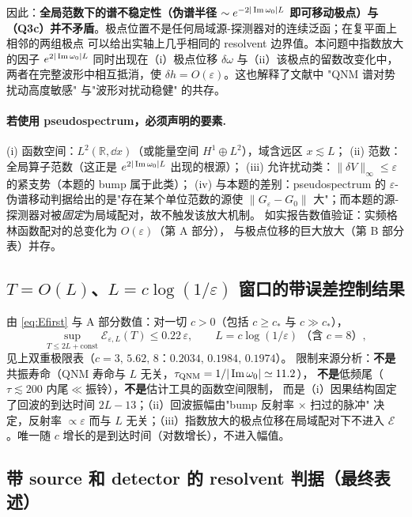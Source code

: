 因此：\textbf{全局范数下的谱不稳定性（伪谱半径 $\sim e^{-2|\operatorname{Im}\omega_0|L}$ 即可移动极点）与
（Q3c）并不矛盾}。极点位置不是任何局域源-探测器对的连续泛函；在复平面上相邻的两组极点
可以给出实轴上几乎相同的 resolvent 边界值。本问题中指数放大的因子
$e^{2|\operatorname{Im}\omega_0|L}$ 同时出现在（i）极点位移 $\delta\omega$ 与（ii）该极点的留数改变化中，
两者在完整波形中相互抵消，使 $\delta h=O(\varepsilon)$。这也解释了文献中
"QNM 谱对势扰动高度敏感" \cite{Jaramillo2021} 与"波形对扰动稳健" \cite{NollertPrice1999} 的共存。

\paragraph{若使用 pseudospectrum，必须声明的要素.}
(i) 函数空间：$L^2(\mathbb R,\dd x)$（或能量空间 $H^1\oplus L^2$），域含远区 $x\lesssim L$；
(ii) 范数：全局算子范数（这正是 $e^{2|\operatorname{Im}\omega_0|L}$ 出现的根源）；
(iii) 允许扰动类：$\|\delta V\|_\infty\le\varepsilon$ 的紧支势（本题的 bump 属于此类）；
(iv) 与本题的差别：pseudospectrum 的 $\varepsilon$-伪谱移动判据给出的是"存在某个单位范数的源使
$\|G_\varepsilon-G_0\|$ 大"；而本题的源-探测器对被\emph{固定}为局域配对，故不触发该放大机制。
如实报告数值验证：实频格林函数配对的总变化为 $O(\varepsilon)$（第 A 部分），
与极点位移的巨大放大（第 B 部分表）并存。

\subsection{$T=O(L)$、$L=c\log(1/\varepsilon)$ 窗口的带误差控制结果}

由 \eqref{eq:Efirst} 与 A 部分数值：对一切 $c>0$（包括 $c\ge c_*$ 与 $c\gg c_*$），
\begin{equation}
\sup_{T\le 2L+\text{const}}\mathcal E_{\varepsilon,L}(T)\le0.22\,\varepsilon ,
\qquad L=c\log(1/\varepsilon)\ \text{（含 }c=8\text{）},
\end{equation}
见上双重极限表（$c=3,\,5.62,\,8$：$0.2034,\,0.1984,\,0.1974$）。
限制来源分析：\textbf{不是}共振寿命（QNM 寿命与 $L$ 无关，$\tau_{\rm QNM}=1/|\operatorname{Im}\omega_0|\simeq11.2$），
\textbf{不是}低频尾（$\tau\lesssim200$ 内尾$\ll$振铃），\textbf{不是}估计工具的函数空间限制，
而是（i）因果结构固定了回波的到达时间 $2L-13$；（ii）回波振幅由"bump 反射率 $\times$ 扫过的脉冲"
决定，反射率 $\propto\varepsilon$ 而与 $L$ 无关；（iii）指数放大的极点位移在局域配对下不进入
$\mathcal E$。唯一随 $c$ 增长的是到达时间（对数增长），不进入幅值。

\subsection{带 source 和 detector 的 resolvent 判据（最终表述）}

